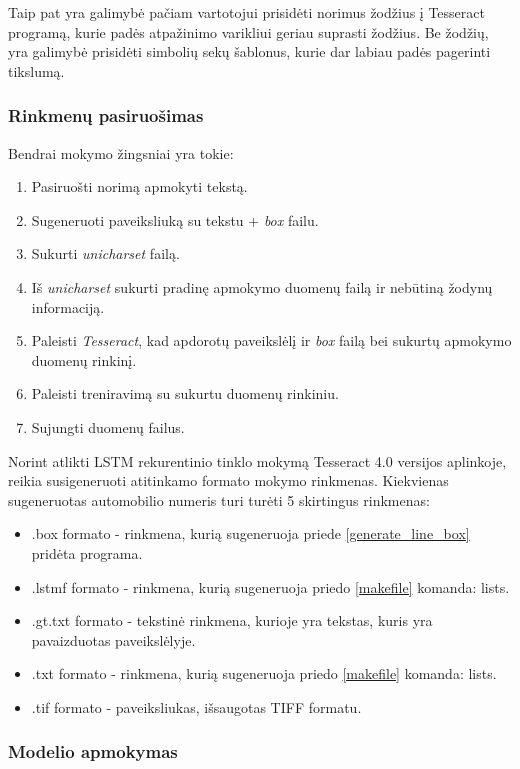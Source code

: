 \documentclass{VUMIFInfBakalaurinis}
\begin{document}
Taip pat yra galimybė pačiam vartotojui prisidėti norimus žodžius į Tesseract programą, kurie padės atpažinimo varikliui geriau suprasti žodžius.
Be žodžių, yra galimybė prisidėti simbolių sekų šablonus, kurie dar labiau padės pagerinti tikslumą.

\subsubsection{Rinkmenų pasiruošimas}
Bendrai mokymo žingsniai yra tokie:

\begin{enumerate}
  \item Pasiruošti norimą apmokyti tekstą.
  \item Sugeneruoti paveiksliuką su tekstu + \textit{box} failu.
  \item Sukurti \textit{unicharset} failą.
  \item Iš \textit{unicharset} sukurti pradinę apmokymo duomenų failą ir nebūtiną žodynų informaciją. 
  \item Paleisti \textit{Tesseract}, kad apdorotų paveikslėlį ir \textit{box} failą bei sukurtų apmokymo duomenų rinkinį.
  \item Paleisti treniravimą su sukurtu duomenų rinkiniu.
  \item Sujungti duomenų failus.
\end{enumerate}

Norint atlikti LSTM rekurentinio tinklo mokymą Tesseract 4.0 versijos aplinkoje, reikia susigeneruoti atitinkamo formato mokymo rinkmenas.
Kiekvienas sugeneruotas automobilio numeris turi turėti 5 skirtingus rinkmenas:
\begin{itemize}
  \item .box formato - rinkmena, kurią sugeneruoja priede \ref{generate_line_box} pridėta programa.
  \item .lstmf formato - rinkmena, kurią sugeneruoja priedo \ref{makefile} komanda: lists. 
  \item .gt.txt formato - tekstinė rinkmena, kurioje yra tekstas, kuris yra pavaizduotas paveikslėlyje.
  \item .txt formato - rinkmena, kurią sugeneruoja priedo \ref{makefile} komanda: lists. 
  \item .tif formato - paveiksliukas, išsaugotas TIFF formatu.
\end{itemize}

\subsubsection{Modelio apmokymas}
\end{document}
